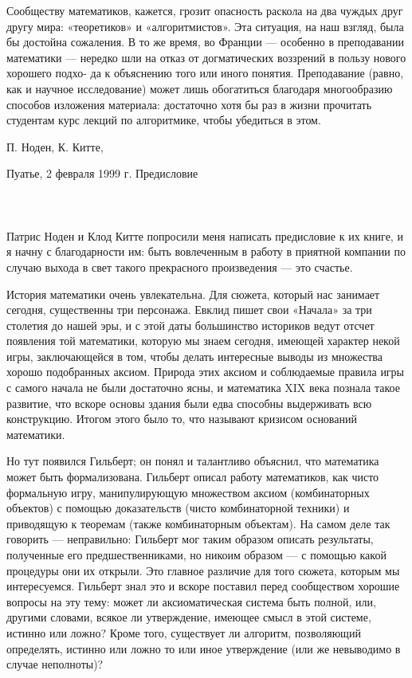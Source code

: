 \documentclass{mai_book}
\begin{document}
{{   Сообществу математиков, кажется, грозит опасность раскола на два чуждых друг другу мира: «теоретиков» и «алгоритмистов». Эта ситуация, на наш взгляд, была бы достойна сожаления. В то же время, во Франции — особенно в преподавании математики — нередко шли на отказ от догматических воззрений в пользу нового хорошего подхо-
\newpage
да к объяснению того или иного понятия. Преподавание (равно, как и научное исследование) может лишь обогатиться благодаря многообразию способов изложения материала: достаточно хотя бы раз в жизни прочитать студентам курс лекций по алгоритмике, чтобы убедиться в этом.

\hspace{3.8in} П. Ноден, К. Китте,
        
\hspace{3.3in} Пуатье, 2 февраля 1999 г.
\newpage
\hspace{1.4in} {\huge Предисловие}
\\\\\\\\
   Патрис Ноден и Клод Китте попросили меня написать предисловие к их книге, и я начну с благодарности им: быть вовлеченным в работу в приятной компании по случаю выхода в свет такого прекрасного произведения — это счастье.

   История математики очень увлекательна. Для сюжета, который нас занимает сегодня, существенны три персонажа. Евклид пишет свои «Начала» за три столетия до нашей эры, и с этой даты большинство историков ведут отсчет появления той математики, которую мы знаем сегодня, имеющей характер некой игры, заключающейся в том, чтобы делать интересные выводы из множества хорошо подобранных аксиом. Природа этих аксиом и соблюдаемые правила игры с самого начала не были достаточно ясны, и математика XIX века познала такое развитие, что вскоре основы здания были едва способны выдерживать всю конструкцию. Итогом этого было то, что называют кризисом оснований математики.

   Но тут появился Гильберт; он понял и талантливо объяснил, что математика может быть формализована. Гильберт описал работу математиков, как чисто формальную игру, манипулирующую множеством аксиом (комбинаторных объектов) с помощью доказательств (чисто комбинаторной техники) и приводящую к теоремам (также комбинаторным объектам). На самом деле так говорить — неправильно: Гильберт мог таким образом описать результаты, полученные его предшественниками, но никоим образом — с помощью какой процедуры они их открыли. Это главное различие для того сюжета, которым мы интересуемся. Гильберт знал это и вскоре поставил перед сообществом хорошие вопросы на эту тему: может ли аксиоматическая система быть полной, или, другими словами, всякое ли утверждение, имеющее смысл в этой системе, истинно или ложно? Кроме того, существует ли алгоритм, позволяющий определять, истинно или ложно то или иное утверждение (или же невыводимо в случае неполноты)?

}}
\end{document}
